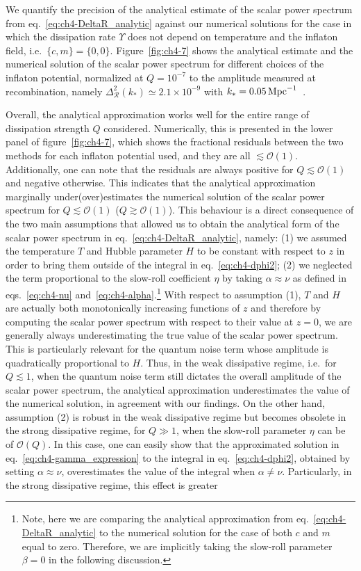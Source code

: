 We quantify the precision of the analytical estimate of the scalar power spectrum from eq.~\eqref{eq:ch4-DeltaR_analytic} against our numerical solutions for the case in which the dissipation rate $\Upsilon$ does not depend on temperature and the inflaton field, i.e.\ $\{c,m\}=\{0,0\}$. Figure~\ref{fig:ch4-7} shows the analytical estimate and the numerical solution of the scalar power spectrum for different choices of the inflaton potential, normalized at $Q=10^{-7}$ to the amplitude measured at recombination, namely $\Delta^2_{\mathcal{R}}(k_*)\simeq 2.1\times10^{-9}$ with $k_*=0.05{\rm\,Mpc}^{-1}$~\cite{Planck:2018vyg}.

Overall, the analytical approximation works well for the entire range of dissipation strength $Q$ considered. Numerically, this is presented in the lower panel of figure~\ref{fig:ch4-7}, which shows the fractional residuals between the two methods for each inflaton potential used, and they are all $\lesssim \mathcal{O}(1)$. Additionally, one can note that the residuals are always positive for $Q\lesssim \mathcal{O}(1)$ and negative otherwise. This indicates that the analytical approximation marginally under(over)estimates the numerical solution of the scalar power spectrum for $Q\lesssim\mathcal{O}(1)$ ($Q\gtrsim\mathcal{O}(1)$). This behaviour is a direct consequence of the two main assumptions that allowed us to obtain the analytical form of the scalar power spectrum in eq.~\eqref{eq:ch4-DeltaR_analytic}, namely: (1) we assumed the temperature $T$ and Hubble parameter $H$ to be constant with respect to $z$ in order to bring them outside of the integral in eq.~\eqref{eq:ch4-dphi2}; (2) we neglected the term proportional to the slow-roll coefficient $\eta$ by taking $\alpha\approx\nu$ as defined in eqs.~\eqref{eq:ch4-nu} and~\eqref{eq:ch4-alpha}.\footnote{Note, here we are comparing the analytical approximation from eq.~\eqref{eq:ch4-DeltaR_analytic} to the numerical solution for the case of both $c$ and $m$ equal to zero. Therefore, we are implicitly taking the slow-roll parameter $\beta=0$ in the following discussion.} With respect to assumption (1), $T$ and $H$ are actually both monotonically increasing functions of $z$ and therefore by computing the scalar power spectrum with respect to their value at $z=0$, we are generally always underestimating the true value of the scalar power spectrum. This is particularly relevant for the quantum noise term whose amplitude is quadratically proportional to $H$. Thus, in the weak dissipative regime, i.e.\ for $Q\lesssim 1$, when the quantum noise term still dictates the overall amplitude of the scalar power spectrum, the analytical approximation underestimates the value of the numerical solution, in agreement with our findings. On the other hand, assumption (2) is robust in the weak dissipative regime but becomes obsolete in the strong dissipative regime, for $Q\gg1$, when the slow-roll parameter $\eta$ can be of $\mathcal{O}(Q)$. In this case, one can easily show that the approximated solution in eq.~\eqref{eq:ch4-gamma_expression} to the integral in eq.~\eqref{eq:ch4-dphi2}, obtained by setting $\alpha\approx\nu$, overestimates the value of the integral when $\alpha\neq\nu $. Particularly, in the strong dissipative regime, this effect is greater 